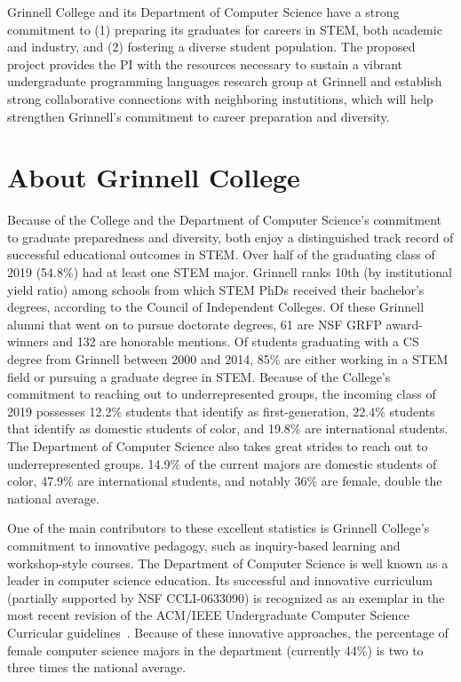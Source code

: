 \documentclass[11pt]{article}
\begin{document}
\startdoc{\longtitle}

Grinnell College and its Department of Computer Science have a strong commitment to (1) preparing its graduates for careers in STEM, both academic and industry, and (2) fostering a diverse student population.
The proposed project provides the PI with the resources necessary to sustain a vibrant undergraduate programming languages research group at Grinnell and establish strong collaborative connections with neighboring instutitions, which will help strengthen Grinnell's commitment to career preparation and diversity.
\vspace{2ex}
\section{About Grinnell College}

Because of the College and the Department of Computer Science's commitment to graduate preparedness and diversity, both enjoy a distinguished track record of successful educational outcomes in STEM.
Over half of the graduating class of 2019 (54.8\%) had at least one STEM major.
Grinnell ranks 10th (by institutional yield ratio) among schools from which STEM PhDs received their bachelor's degrees, according to the Council of Independent Colleges.
Of these Grinnell alumni that went on to pursue doctorate degrees, 61 are NSF GRFP award-winners and 132 are honorable mentions.
Of students graduating with a CS degree from Grinnell between 2000 and 2014, 85\% are either working in a STEM field or pursuing a graduate degree in STEM.
Because of the College's commitment to reaching out to underrepresented groups, the incoming class of 2019 possesses 12.2\% students that identify as first-generation, 22.4\% students that identify as domestic students of color, and 19.8\% are international students.
The Department of Computer Science also takes great strides to reach out to underrepresented groups.
14.9\% of the current majors are domestic students of color, 47.9\% are international students, and notably 36\% are female, double the national average.

One of the main contributors to these excellent statistics is Grinnell College's commitment to innovative pedagogy, such as inquiry-based learning and workshop-style courses.
The Department of Computer Science is well known as a leader in computer science education.
Its successful and innovative curriculum~\cite{cowden:sigcse:2012, rebelsky:sigcse:2013} (partially supported by NSF CCLI-0633090) is recognized as an exemplar in the most recent revision of the ACM/IEEE Undergraduate Computer Science Curricular guidelines~\cite{acm:curriculum:2013}.
Because of these innovative approaches, the percentage of female computer science majors in the department (currently 44\%) is two to three times the national average.
\end{document}
